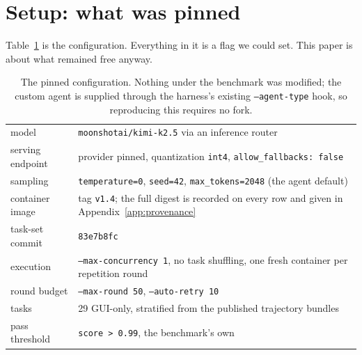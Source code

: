 \section{Setup: what was pinned}
\label{sec:setup}

Table~\ref{tab:setup} is the configuration. Everything in it is a flag we could
set. This paper is about what remained free anyway.

\begin{table}[t]
\centering\small
\caption{The pinned configuration. Nothing under the benchmark was modified;
the custom agent is supplied through the harness's existing
\texttt{--agent-type} hook, so reproducing this requires no fork.}
\label{tab:setup}
\begin{tabular}{ll}
\toprule
model & \texttt{moonshotai/kimi-k2.5} via an inference router \\
serving endpoint & provider pinned, quantization \texttt{int4},
                   \texttt{allow\_fallbacks: false} \\
sampling & \texttt{temperature=0}, \texttt{seed=42},
           \texttt{max\_tokens=2048} (the agent default) \\
container image & tag \texttt{v1.4}; the full digest is recorded on every row and given in Appendix~\ref{app:provenance} \\
task-set commit & \texttt{83e7b8fc} \\
execution & \texttt{--max-concurrency 1}, no task shuffling,
            one fresh container per repetition round \\
round budget & \texttt{--max-round 50}, \texttt{--auto-retry 10} \\
tasks & 29 GUI-only, stratified from the published trajectory bundles \\
pass threshold & \texttt{score > 0.99}, the benchmark's own \\
\bottomrule
\end{tabular}
\end{table}

